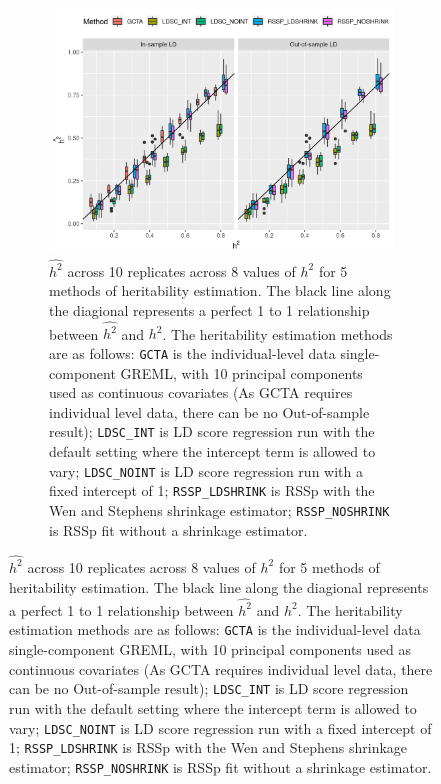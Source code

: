 \begin{figure}
\begin{subfigure}[t]{\textwidth}
    \includegraphics[width=.9\linewidth]{img/rssp_v_ldsc_v_gcta.png}
    \caption{$\hat{h^2}$ across 10 replicates across 8 values of $h^2$ for 5 methods of heritability estimation. The black line along the diagional represents a perfect 1 to 1 relationship between $\hat{h^2}$ and $h^2$.    The heritability estimation methods are as follows: \texttt{GCTA} is the individual-level data single-component GREML, with 10 principal components used as continuous covariates (As GCTA requires individual level data, there can be no Out-of-sample result); \texttt{LDSC_INT} is LD score regression \cite{ldsc} run with the default setting where the intercept term is allowed to vary;  \texttt{LDSC_NOINT} is LD score regression run with a fixed intercept of 1; \texttt{RSSP_LDSHRINK} is RSSp with the Wen and Stephens\cite{Wen_2010} shrinkage estimator; \texttt{RSSP_NOSHRINK} is RSSp fit without a shrinkage estimator.}\label{fig:rssp_method_comparison}
  \end{subfigure}
\end{figure}




